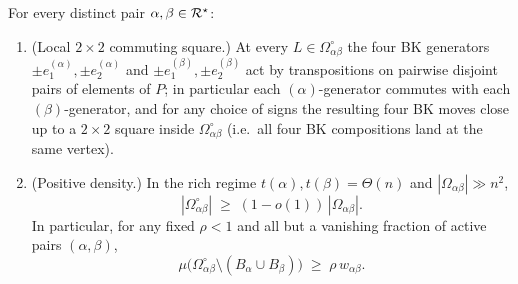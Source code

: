 \begin{lemma}\label{lem:gap3}
For every distinct pair $\alpha,\beta\in\mathcal{R}^\star$:
\begin{enumerate}[label=\textup{(\alph*)},nosep]
\item\label{it:gap3-square}
  \textup{(Local $2\times 2$ commuting square.)}
  At every $L\in\Omega^{\circ}_{\alpha\beta}$ the four BK generators
  $\pm e_1^{(\alpha)},\pm e_2^{(\alpha)}$ and
  $\pm e_1^{(\beta)},\pm e_2^{(\beta)}$ act by transpositions on
  pairwise disjoint pairs of elements of $P$; in particular each
  $(\alpha)$-generator commutes with each $(\beta)$-generator, and
  for any choice of signs the resulting four BK moves close up to a
  $2\times 2$ square inside $\Omega^{\circ}_{\alpha\beta}$ (i.e.\ all
  four BK compositions land at the same vertex).
\item\label{it:gap3-density}
  \textup{(Positive density.)}
  In the rich regime $t(\alpha),t(\beta)=\Theta(n)$ and
  $|\Omega_{\alpha\beta}|\gg n^2$,
  \[
    |\Omega^{\circ}_{\alpha\beta}|
    \;\ge\;(1-o(1))\,|\Omega_{\alpha\beta}|.
  \]
  In particular, for any fixed $\rho<1$ and all but a vanishing
  fraction of active pairs $(\alpha,\beta)$,
  \[
    \mu\bigl(\Omega^{\circ}_{\alpha\beta}\setminus
              (B_\alpha\cup B_\beta)\bigr)
    \;\ge\;\rho\,w_{\alpha\beta}.
  \]
\end{enumerate}
\end{lemma}

